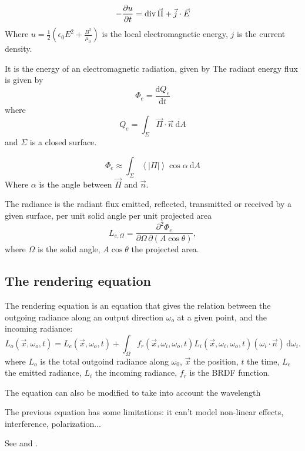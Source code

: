 \begin{theorem}
    \[
        -\frac{\partial u}{\partial t} = \operatorname{div} \vec \Pi + \vec j \cdot \vec E
    \]
    Where \(u = \frac{1}{2}\left(\epsilon_0 E^2 + \frac{B^2}{\mu_0}\right)\) is the local electromagnetic energy, \(j\) is the current density.
\end{theorem}

\begin{definition}
    It is the energy of an electromagnetic radiation, given by
    The radiant energy flux is given by
    \[\Phi_e = \frac{\mathrm d Q_e}{\mathrm{d} t}\]
    where
    \[
        Q_e = \int_\Sigma \vec \Pi \cdot \vec n\ \mathrm d A
    \]
    and \(\Sigma\) is a closed surface.
\end{definition}
\begin{theorem}
    \[
        \Phi_e \approx \int_\Sigma \left< |\Pi| \right> \cos \alpha\ \mathrm d A
    \]
    Where \(\alpha\) is the angle between \(\vec \Pi\) and \(\vec n\).
\end{theorem}

\begin{definition}[Radiance]
    The radiance is the radiant flux emitted, reflected, transmitted or received by a given surface, per unit solid angle per unit projected area
    \[
        L_{e, \Omega} = \frac{\partial^2 \Phi_e}{\partial \Omega\,\partial (A \cos \theta)},
    \]
    where \(\Omega\) is the solid angle, \(A \cos \theta\) the projected area.

\end{definition}

\subsection{The rendering equation}
\begin{definition}
    The rendering equation is an equation that gives the relation between the outgoing radiance along an output direction \(\omega_o\) at a given point,
    and the incoming radiance:
    \[
        L_o(\vec x, \omega_o, t) = L_e(\vec x, \omega_o, t) + \int_\Omega f_r(\vec x, \omega_i, \omega_o, t)L_i (\vec x, \omega_i, \omega_o, t) (\omega_i \cdot \vec n) \,\mathrm d \omega_i.
    \]
    where \(L_o\) is the total outgoind radiance along \(\omega_0\),
    \(\vec x\) the position, \(t\) the time, \(L_e\) the emitted radiance, \(L_i\) the incoming radiance, \(f_r\) is the BRDF function.

    The equation can also be modified to take into account the wavelength
\end{definition}

The previous equation has some limitations: it can't model non-linear effects, interference, polarization...

See  and .

\begin{definition}\label{def:BRDF}


\end{definition}
